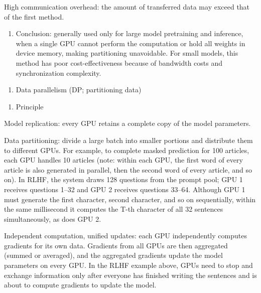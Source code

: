 High communication overhead: the amount of transferred data may exceed that of the first method.

\begin{enumerate}
\def\labelenumi{(\arabic{enumi})}
\setcounter{enumi}{3}
\tightlist
\item
  Conclusion: generally used only for large model pretraining and inference, when a single GPU cannot perform the computation or hold all weights in device memory, making partitioning unavoidable. For small models, this method has poor cost-effectiveness because of bandwidth costs and synchronization complexity.
\end{enumerate}

\begin{enumerate}
\def\labelenumi{\arabic{enumi}.}
\setcounter{enumi}{2}
\tightlist
\item
  Data parallelism (DP; partitioning data)
\end{enumerate}

\begin{enumerate}
\def\labelenumi{(\arabic{enumi})}
\tightlist
\item
  Principle
\end{enumerate}

Model replication: every GPU retains a complete copy of the model parameters.

Data partitioning: divide a large batch into smaller portions and distribute them to different GPUs. For example, to complete masked prediction for 100 articles, each GPU handles 10 articles (note: within each GPU, the first word of every article is also generated in parallel, then the second word of every article, and so on). In RLHF, the system draws 128 questions from the prompt pool; GPU 1 receives questions 1--32 and GPU 2 receives questions 33--64. Although GPU 1 must generate the first character, second character, and so on sequentially, within the same millisecond it computes the T-th character of all 32 sentences simultaneously, as does GPU 2.

Independent computation, unified updates: each GPU independently computes gradients for its own data. Gradients from all GPUs are then aggregated (summed or averaged), and the aggregated gradients update the model parameters on every GPU. In the RLHF example above, GPUs need to stop and exchange information only after everyone has finished writing the sentences and is about to compute gradients to update the model.


